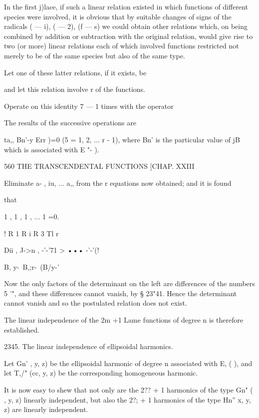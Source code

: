 {{{{{{{In the first j)lace, if such a linear relation existed in which functions of 
different species were involved, it is obvious that by suitable changes of signs 
of the radicals \/(  —  i), \/(  —  2), \/(f —  s) we could obtain other relations 
which, on being combined by addition or subtraction with the original relation, 
would give rise to two (or more) linear relations each of which involved 
functions restricted not merely to be of the same species but also of the same 
type. 

Let one of these latter relations, if it exists, be 

and let this relation involve r of the functions. 

Operate on this identity 7  — 1 times with the operator 



The results of the successive operations are 

ta,,  Bn'-y Err  )=0 (5 = 1, 2, ... r - 1), 
where Bn'  is the particular value of jB which is associated with E "-   ). 



560 THE TRANSCENDENTAL FUNCTIONS [CHAP. XXIII 

Eliminate a- , iu, ... a,, from the r equations now obtained; and it is found 

that 

1 , 1 , 1 , ... 1 =0. 

! R 1 R i R 3 Tl r 

 Dii , J->n , -'-'71 > ••• -'-'(! 



 B, y-\  B,;r-\ (B/y-' 

Now the only factors of the determinant on the left are differences of the 
numbers 5 '", and these differences cannot vanish, by § 23"41. Hence the 
determinant cannot vanish and so the postulated relation does not exist. 

The linear independence of the 2m +1 Lame functions of degree n is 
therefore established. 

2345. The linear independence of ellipsoidal harmonics. 

Let Gn'    , y, z) be the ellipsoidal harmonic of degree n associated with 
E,  ( ), and let  T,/" (cc, y, z) be the corresponding homogeneous harmonic. 

It is now easy to shew that not only are the 2?? + 1 harmonics of the type 
Gn"  ( , y, z) linearly independent, but also the 2?; + 1 harmonics of the type 
Hn''  x, y, z) are linearly independent. 

}}}}}}}
